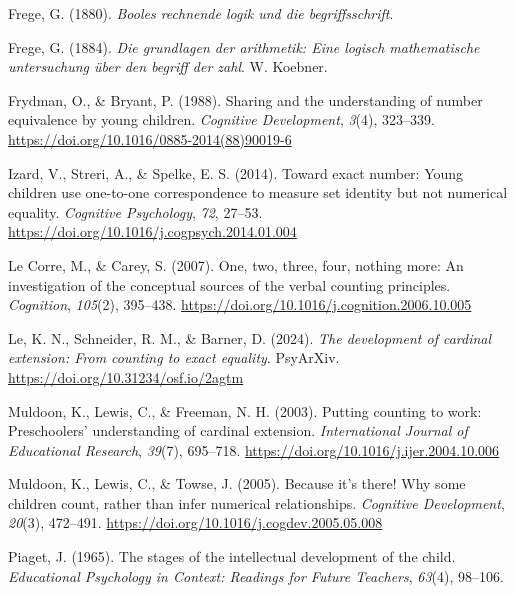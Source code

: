 \documentclass[10pt, letterpaper]{article}
\newenvironment{CSLReferences}%
  {}%
  {\par}
\begin{document}
\begin{CSLReferences}
\leavevmode{}%
Frege, G. (1880). \emph{Booles rechnende logik und die begriffsschrift}.

\leavevmode{}%
Frege, G. (1884). \emph{Die grundlagen der arithmetik: Eine logisch
mathematische untersuchung über den begriff der zahl}. W. Koebner.

\leavevmode{}%
Frydman, O., \& Bryant, P. (1988). Sharing and the understanding of
number equivalence by young children. \emph{Cognitive Development},
\emph{3}(4), 323--339.
\url{https://doi.org/10.1016/0885-2014(88)90019-6}

\leavevmode{}%
Izard, V., Streri, A., \& Spelke, E. S. (2014). Toward exact number:
{Young} children use one-to-one correspondence to measure set identity
but not numerical equality. \emph{Cognitive Psychology}, \emph{72},
27--53. \url{https://doi.org/10.1016/j.cogpsych.2014.01.004}

\leavevmode{}%
Le Corre, M., \& Carey, S. (2007). One, two, three, four, nothing more:
An investigation of the conceptual sources of the verbal counting
principles. \emph{Cognition}, \emph{105}(2), 395--438.
\url{https://doi.org/10.1016/j.cognition.2006.10.005}

\leavevmode{}%
Le, K. N., Schneider, R. M., \& Barner, D. (2024). \emph{The development
of cardinal extension: From counting to exact equality}. PsyArXiv.
\url{https://doi.org/10.31234/osf.io/2agtm}

\leavevmode{}%
Muldoon, K., Lewis, C., \& Freeman, N. H. (2003). Putting counting to
work: Preschoolers' understanding of cardinal extension.
\emph{International Journal of Educational Research}, \emph{39}(7),
695--718. \url{https://doi.org/10.1016/j.ijer.2004.10.006}

\leavevmode{}%
Muldoon, K., Lewis, C., \& Towse, J. (2005). Because it's there! Why
some children count, rather than infer numerical relationships.
\emph{Cognitive Development}, \emph{20}(3), 472--491.
\url{https://doi.org/10.1016/j.cogdev.2005.05.008}

\leavevmode{}%
Piaget, J. (1965). The stages of the intellectual development of the
child. \emph{Educational Psychology in Context: Readings for Future
Teachers}, \emph{63}(4), 98--106.


\end{CSLReferences}
\end{document}
